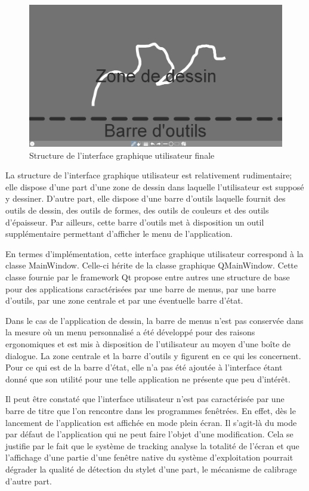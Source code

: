 \documentclass[11pt,a4paper,oldfontcommands]{memoir}
\begin{document}
\begin{figure}[h]
\centering
\includegraphics[scale=0.4]{images/ui-final-structure.png}
\caption{Structure de l'interface graphique utilisateur finale}
\end{figure}

La structure de l'interface graphique utilisateur est relativement rudimentaire; elle dispose d'une part d'une zone de dessin dans laquelle l'utilisateur est supposé y dessiner. D'autre part, elle dispose d'une barre d'outils laquelle fournit des outils de dessin, des outils de formes, des outils de couleurs et des outils d'épaisseur. Par ailleurs, cette barre d'outils met à disposition un outil supplémentaire permettant d'afficher le menu de l'application.

En termes d'implémentation, cette interface graphique utilisateur correspond à la classe MainWindow. Celle-ci hérite de la classe graphique QMainWindow. Cette classe fournie par le framework Qt propose entre autres une structure de base pour des applications caractérisées par une barre de menus, par une barre d'outils, par une zone centrale et par une éventuelle barre d'état.

Dans le cas de l'application de dessin, la barre de menus n'est pas conservée dans la mesure où un menu personnalisé a été développé pour des raisons ergonomiques et est mis à disposition de l'utilisateur au moyen d'une boîte de dialogue. La zone centrale et la barre d'outils y figurent en ce qui les concernent. Pour ce qui est de la barre d'état, elle n'a pas été ajoutée à l'interface étant donné que son utilité pour une telle application ne présente que peu d'intérêt.

Il peut être constaté que l'interface utilisateur n'est pas caractérisée par une barre de titre que l'on rencontre dans les programmes fenêtrées. En effet, dès le lancement de l'application est affichée en mode plein écran. Il s'agit-là du mode par défaut de l'application qui ne peut faire l'objet d'une modification. Cela se justifie par le fait que le système de tracking analyse la totalité de l'écran et que l'affichage d'une partie d'une fenêtre native du système d'exploitation pourrait dégrader la qualité de détection du stylet d'une part, le mécanisme de calibrage d'autre part.
\end{document}
